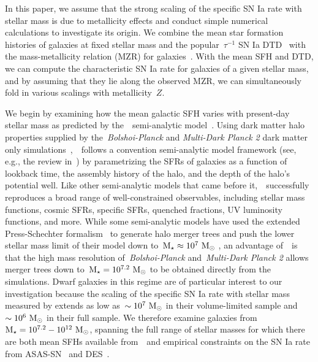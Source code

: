 \documentclass[ms.tex]{subfiles}
\begin{document}
In this paper, we assume that the strong scaling of the specific SN Ia rate
with stellar mass is due to metallicity effects and conduct simple numerical
calculations to investigate its origin.
We combine the mean star formation histories of galaxies at fixed stellar
mass and the popular~$\tau^{-1}$ SN Ia DTD~\citep[e.g.][]{Maoz2012a}
with the mass-metallicity relation (MZR) for galaxies~\citep{Tremonti2004,
Andrews2013, Zahid2011, Zahid2014}.
With the mean SFH and DTD, we can compute the characteristic SN Ia rate for
galaxies of a given stellar mass, and by assuming that they lie along the
observed MZR, we can simultaneously fold in various scalings with
metallicity~$Z$.
\par
We begin by examining how the mean galactic SFH varies with present-day stellar
mass as predicted by the~\um~semi-analytic model~\citep{Behroozi2019}.
Using dark matter halo properties supplied by the~\textit{Bolshoi-Planck} and
\textit{Multi-Dark Planck 2} dark matter only simulations~\citep{Klypin2016,
RodriguezPuebla2016},~\um~follows a convention semi-analytic model framework
(see, e.g., the review in~\citealt{Somerville2015a}) by parametrizing the SFRs
of galaxies as a function of lookback time, the assembly history of the halo,
and the depth of the halo's potential well.
Like other semi-analytic models that came before it,~\um~successfully
reproduces a broad range of well-constrained observables, including stellar
mass functions, cosmic SFRs, specific SFRs, quenched fractions, UV luminosity
functions, and more.
While some semi-analytic models have used the extended Press-Schechter
formalism~\citep{Press1974, Bond1991} to generate halo merger trees and push
the lower stellar mass limit of their model down to~$\text{M}_\star \approx 10^7~\text{M}_\odot$
\citep[e.g.][]{Somerville2015b}, an advantage of~\um~is that the high mass
resolution of~\textit{Bolshoi-Planck} and~\textit{Multi-Dark Planck 2}
allows merger trees down to~$\text{M}_\star = 10^{7.2}~\text{M}_\odot$ to be obtained directly
from the simulations.
Dwarf galaxies in this regime are of particular interest to our investigation
because the scaling of the specific SN Ia rate with stellar mass measured by
\citet{Brown2019} extends as low as~$\sim 10^7~\text{M}_\odot$ in their volume-limited
sample and~$\sim 10^6~\text{M}_\odot$ in their full sample.
We therefore examine galaxies from~$\text{M}_\star = 10^{7.2} - 10^{12}~\text{M}_\odot$,
spanning the full range of stellar masses for which there are both mean SFHs
available from~\um~and empirical constraints on the SN Ia rate from
ASAS-SN~\citep{Brown2019, Gandhi2022} and DES~\citep{Wiseman2021}.
\par
\end{document}
